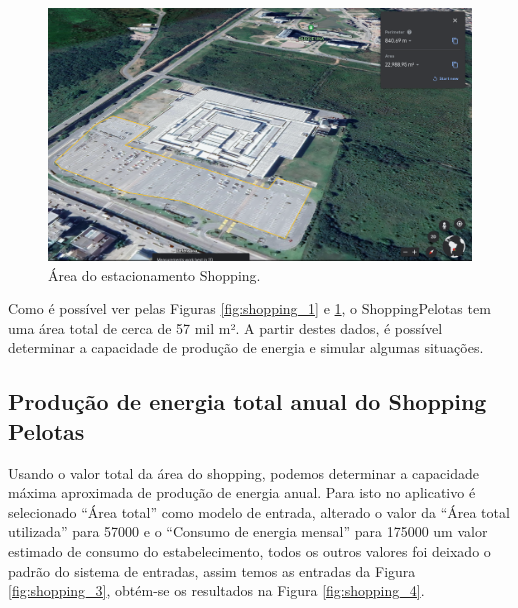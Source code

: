 \begin{figure}[H]
    \centering
    \includegraphics[width=1\textwidth]{./Figuras/shopping_2.png}
    \caption{Área do estacionamento Shopping.}
   \label{fig:shopping_2}
\end{figure}

\newpage
Como é possível ver pelas Figuras \ref{fig:shopping_1} e \ref{fig:shopping_2}, o ShoppingPelotas tem uma área total de cerca de 57 mil m². A partir destes dados, é possível determinar a capacidade de produção de energia e simular algumas situações.

\subsection{Produção de energia total anual do Shopping Pelotas}

Usando o valor total da área do shopping, podemos determinar a capacidade máxima aproximada de produção de energia anual. Para isto no aplicativo é selecionado ``Área total'' como modelo de entrada, alterado o valor da ``Área total utilizada'' para 57000 e o ``Consumo de energia mensal'' para 175000 um valor estimado de consumo do estabelecimento, todos os outros valores foi deixado o padrão do sistema de entradas, assim temos as entradas da Figura \ref{fig:shopping_3}, obtém-se os resultados na Figura \ref{fig:shopping_4}.

